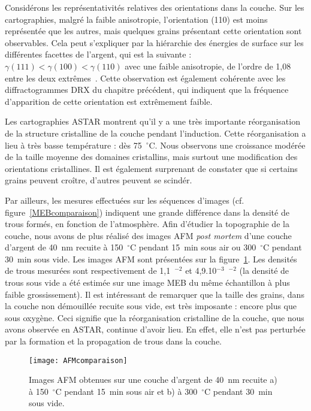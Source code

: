 Considérons les représentativités relatives des orientations dans la couche. Sur les cartographies, malgré la faible anisotropie, l’orientation (110) est moins représentée que les autres, mais quelques grains présentant cette orientation sont observables. Cela peut s’expliquer par la hiérarchie des énergies de surface sur les différentes facettes de l’argent, qui est la suivante : $\gamma(111) < \gamma(100) < \gamma(110)$ avec une faible anisotropie, de l’ordre de 1,08 entre les deux extrêmes~\cite{stankic2013equilibrium, molina2011size}. Cette observation est également cohérente avec les diffractogrammes DRX du chapitre précédent, qui indiquent que la fréquence d'apparition de cette orientation est extrêmement faible.\par 
Les cartographies ASTAR montrent qu’il y a une très importante réorganisation de la structure cristalline de la couche pendant l’induction. Cette réorganisation a lieu à très basse température : dès 75~$^\circ$C. Nous observons une croissance modérée de la taille moyenne des domaines cristallins, mais surtout une modification des orientations cristallines. Il est également surprenant de constater que si certains grains peuvent croître, d’autres peuvent se scindér.\par 
Par ailleurs, les mesures effectuées sur les séquences d’images (cf. figure~\ref{MEBcomparaison}) indiquent une grande différence dans la densité de trous formés, en fonction de l’atmosphère. Afin d’étudier la topographie de la couche, nous avons de plus réalisé des images AFM \textit{post mortem} d’une couche d’argent de 40~nm recuite à 150~$^\circ$C pendant 15~min sous air ou 300~$^\circ$C pendant 30~min sous vide. Les images AFM sont présentées sur la figure~\ref{AFMcomparaison}. Les densités de trous mesurées sont respectivement de 1,1~\micro\meter$^{-2}$ et 4,9.10$^{-3}$~\micro\meter$^{-2}$ (la densité de trous sous vide a été estimée sur une image MEB du même échantillon à plus faible grossissement). Il est intéressant de remarquer que la taille des grains, dans la couche non démouillée recuite sous vide, est très imposante : encore plus que sous oxygène. Ceci signifie que la réorganisation cristalline de la couche, que nous avons observée en ASTAR, continue d’avoir lieu. En effet, elle n'est pas perturbée par la formation et la propagation de trous dans la couche.
\begin{figure}[!htb]
\centering
\texttt{[image: AFMcomparaison]}
\caption{Images AFM obtenues sur une couche d’argent de 40~nm recuite a) à 150~$^\circ$C pendant 15~min sous air et b) à 300~$^\circ$C pendant 30~min sous vide.}
\label{AFMcomparaison}
\end{figure}
